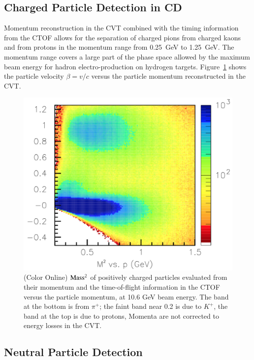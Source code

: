 \documentclass[final,3p,twocolumn]{elsarticle}
\begin{document}
\subsection{Charged Particle Detection in CD} 

Momentum reconstruction in the CVT combined with the timing information from the CTOF allows for the separation 
of charged pions from charged kaons and from protons in the momentum range from 0.25~GeV to 1.25~GeV. The momentum
range covers a large part of the phase space allowed by the maximum beam energy for hadron electro-production 
on hydrogen targets. Figure~\ref{CD-PID} shows the particle velocity $\beta = v/c$ versus the particle momentum 
reconstructed in the CVT.

\begin{figure}[t!]
\centerline{\includegraphics[width=1.\columnwidth]{ctof-pid-3.png}}
\caption{(Color Online) {$\rm Mass^2$} of positively charged particles evaluated from their momentum and the time-of-flight information
in the CTOF versus the particle momentum, at 10.6 GeV beam energy. The band at the bottom is from $\pi^+$; the faint band 
near 0.2 is due to $K^+$, the band at the top is due to protons,  Momenta are not corrected to energy losses in the CVT.}
\label{CD-PID}
\end{figure} 

\subsection{Neutral Particle Detection} 
\end{document}
